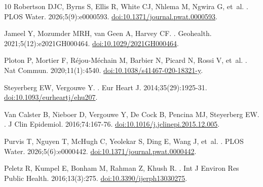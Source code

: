 \documentclass[10pt,letterpaper]{article}
\begin{document}
\begin{thebibliography}{10}
{Robertson} DJC, {Byrns} S, {Ellis} R, {White} CJ, {Nhlema} M, {Ngwira} G,
  et~al.
.
\newblock PLOS Water. 2026;5(9):e0000593.
\newblock \href {http://dx.doi.org/10.1371/journal.pwat.0000593}
  {doi:10.1371/journal.pwat.0000593}.

{Jameel} Y, {Mozumder} MRH, {van Geen} A, {Harvey} CF.
.
\newblock Geohealth. 2021;5(12):e2021GH000464.
\newblock \href {http://dx.doi.org/10.1029/2021GH000464}
  {doi:10.1029/2021GH000464}.

{Ploton} P, {Mortier} F, {R{\'e}jou-M{\'e}chain} M, {Barbier} N, {Picard} N,
  {Rossi} V, et~al.
.
\newblock Nat Commun. 2020;11(1):4540.
\newblock \href {http://dx.doi.org/10.1038/s41467-020-18321-y}
  {doi:10.1038/s41467-020-18321-y}.

{Steyerberg} EW, {Vergouwe} Y.
.
\newblock Eur Heart J. 2014;35(29):1925-31.
\newblock \href {http://dx.doi.org/10.1093/eurheartj/ehu207}
  {doi:10.1093/eurheartj/ehu207}.

{Van Calster} B, {Nieboer} D, {Vergouwe} Y, {De Cock} B, {Pencina} MJ,
  {Steyerberg} EW.
.
\newblock J Clin Epidemiol. 2016;74:167-76.
\newblock \href {http://dx.doi.org/10.1016/j.jclinepi.2015.12.005}
  {doi:10.1016/j.jclinepi.2015.12.005}.

{Purvis} T, {Nguyen} T, {McHugh} C, {Yeolekar} S, {Ding} E, {Wang} J, et~al.
.
\newblock PLOS Water. 2026;5(6):e0000442.
\newblock \href {http://dx.doi.org/10.1371/journal.pwat.0000442}
  {doi:10.1371/journal.pwat.0000442}.

{Peletz} R, {Kumpel} E, {Bonham} M, {Rahman} Z, {Khush} R.
.
\newblock Int J Environ Res Public Health. 2016;13(3):275.
\newblock \href {http://dx.doi.org/10.3390/ijerph13030275}
  {doi:10.3390/ijerph13030275}.

\end{thebibliography}
\end{document}
